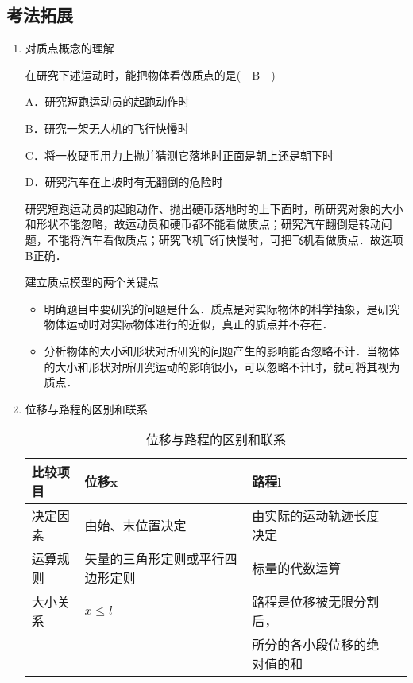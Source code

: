 \documentclass[cn,11pt]{elegantbook}
\begin{document}
      \subsection{考法拓展}
      \begin{enumerate}
         \item 对质点概念的理解
         \begin{exercise}
            在研究下述运动时，能把物体看做质点的是(　B　)

            A．研究短跑运动员的起跑动作时

            B．研究一架无人机的飞行快慢时

            C．将一枚硬币用力上抛并猜测它落地时正面是朝上还是朝下时

            D．研究汽车在上坡时有无翻倒的危险时
            \begin{solution}
               研究短跑运动员的起跑动作、抛出硬币落地时的上下面时，所研究对象的大小和形状不能忽略，故运动员和硬币都不能看做质点；研究汽车翻倒是转动问题，不能将汽车看做质点；研究飞机飞行快慢时，可把飞机看做质点．故选项B正确．

               
            \end{solution}
            
         \end{exercise}
         \begin{note}
            建立质点模型的两个关键点
            \begin{itemize}
               \item 明确题目中要研究的问题是什么．质点是对实际物体的科学抽象，是研究物体运动时对实际物体进行的近似，真正的质点并不存在．
               \item 分析物体的大小和形状对所研究的问题产生的影响能否忽略不计．当物体的大小和形状对所研究运动的影响很小，可以忽略不计时，就可将其视为质点．
            \end{itemize}
         \end{note}
         \item 位移与路程的区别和联系
         
         \begin{table}[htbp]
            \centering
            \caption{位移与路程的区别和联系}
              \begin{tabular}{llll}
              \toprule
              比较项目 & 位移x & 路程l  \\
              \midrule
              决定因素 & 由始、末位置决定 & 由实际的运动轨迹长度决定\\
              运算规则 & 矢量的三角形定则或平行四边形定则 & 标量的代数运算   \\
              大小关系 & $x \leqslant l$ & 路程是位移被无限分割后，\\
              &&所分的各小段位移的绝对值的和  \\
              \bottomrule
              \end{tabular}%
            \label{tab:theorem-class}%
          \end{table}%
         

\end{enumerate}
\end{document}
